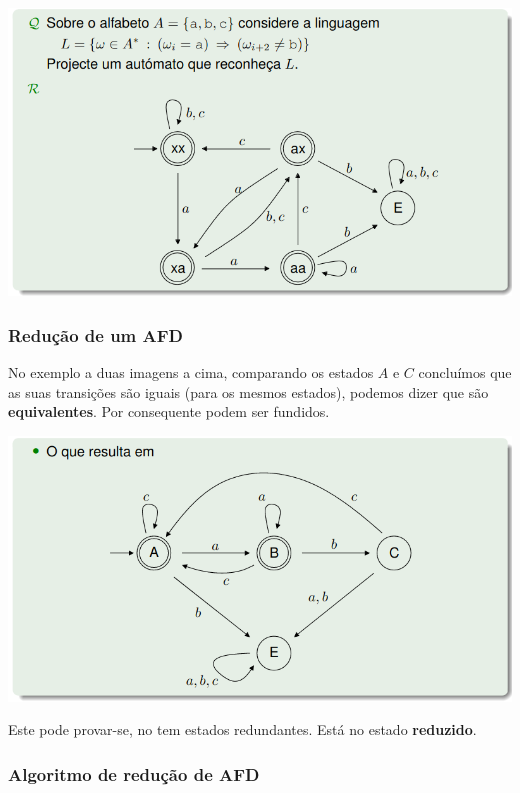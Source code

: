 \documentclass{article}
\begin{document}
\begin{center}
  \includegraphics[scale=0.4]{40}
\end{center}
\hfill

\subsubsection{Redução de um AFD}

\begin{flushleft}
  No exemplo a duas imagens a cima, comparando os estados $A$ e $C$ concluímos que
  as suas transições são iguais (para os mesmos estados), podemos dizer que são \textbf{equivalentes}.
  Por consequente podem ser fundidos.

  \begin{center}
    \includegraphics[scale=0.4]{41}
  \end{center}

  Este pode provar-se, no tem estados redundantes. Está no estado \textbf{reduzido}.
\end{flushleft}

\subsubsection{Algoritmo de redução de AFD}
\end{document}

